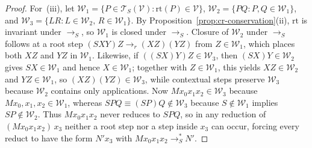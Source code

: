 \documentclass[11pt,reqno]{amsart}
\numberwithin{equation}{section}
\theoremstyle{plain}
\theoremstyle{definition}
\theoremstyle{remark}
\newcommand{\TSV}{\mathcal{T}_S(\mathcal{V})}
\newcommand{\redS}{\to_S}
\newcommand{\redSs}{\to_S^*}
\begin{document}
\begin{proof}
For~(iii), let $\mathcal{W}_1 = \{P \in \TSV : \mathrm{rt}(P) \in \mathcal{V}\}$, $\mathcal{W}_2 = \{P Q : P, Q \in \mathcal{W}_1\}$, and $\mathcal{W}_3 = \{L R : L \in \mathcal{W}_2,\, R \in \mathcal{W}_1\}$. By Proposition~\ref{prop:cr-conservation}(ii), $\mathrm{rt}$ is invariant under $\redS$, so $\mathcal{W}_1$ is closed under $\redS$. Closure of $\mathcal{W}_2$ under $\redS$ follows at a root step $(S X Y) Z \to_r (X Z)(Y Z)$ from $Z \in \mathcal{W}_1$, which places both $X Z$ and $Y Z$ in $\mathcal{W}_1$. Likewise, if $((S X) Y) Z \in \mathcal{W}_3$, then $(S X) Y \in \mathcal{W}_2$ gives $S X \in \mathcal{W}_1$ and hence $X \in \mathcal{W}_1$; together with $Z \in \mathcal{W}_1$, this yields $X Z \in \mathcal{W}_2$ and $Y Z \in \mathcal{W}_1$, so $(X Z)(Y Z) \in \mathcal{W}_3$, while contextual steps preserve $\mathcal{W}_3$ because $\mathcal{W}_2$ contains only applications. Now $M x_0 x_1 x_2 \in \mathcal{W}_3$ because $M x_0, x_1, x_2 \in \mathcal{W}_1$, whereas $S P Q \equiv (S P) Q \notin \mathcal{W}_3$ because $S \notin \mathcal{W}_1$ implies $S P \notin \mathcal{W}_2$. Thus $M x_0 x_1 x_2$ never reduces to $S P Q$, so in any reduction of $(M x_0 x_1 x_2)\,x_3$ neither a root step nor a step inside $x_3$ can occur, forcing every reduct to have the form $N' x_3$ with $M x_0 x_1 x_2 \redSs N'$.
\end{proof}
\end{document}
